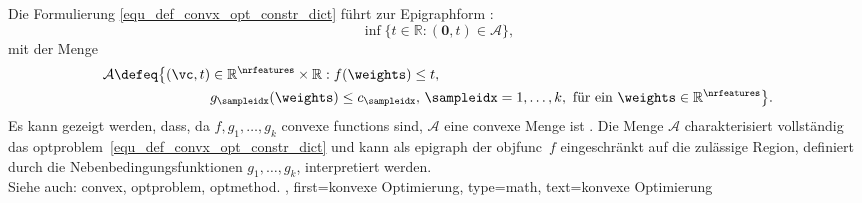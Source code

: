{{    Die Formulierung \eqref{equ_def_convx_opt_constr_dict} führt zur Epigraphform \cite[Sec 5.3]{BoydConvexBook}:
    $$
    \inf \big\{ t \in \mathbb{R} : (\mathbf{0}, t) \in \mathcal{A} \big\},
    $$
    mit der Menge
    \begin{align}
    \mathcal{A} \defeq \big\{ (\vc,t) & \in \mathbb{R}^{\nrfeatures} \times \mathbb{R} : f(\weights) \leq t, \, \nonumber \\
    & g_{\sampleidx}(\weights) \leq c_{\sampleidx}, \, \sampleidx = 1,\ldots,k, \text{ für ein } \weights \in \mathbb{R}^{\nrfeatures} \big\}. \nonumber
    \end{align}
    Es kann gezeigt werden, dass, da $f,g_{1},\ldots,g_{k}$ \gls{convex}e \glspl{function} sind, $\mathcal{A}$ eine \gls{convex}e Menge ist \cite[Ch.2]{BoydConvexBook}.
	 Die Menge $\mathcal{A}$ charakterisiert vollständig das \gls{optproblem}~\eqref{equ_def_convx_opt_constr_dict} und kann als \gls{epigraph} der \gls{objfunc}~$f$ eingeschränkt 
	 auf die zulässige Region, definiert durch die Nebenbedingungsfunktionen $g_1,\ldots,g_k$, interpretiert werden.\\
    Siehe auch: \gls{convex}, \gls{optproblem}, \gls{optmethod}.
    },
    first={konvexe Optimierung},
    type=math,
    text={konvexe Optimierung}
}

